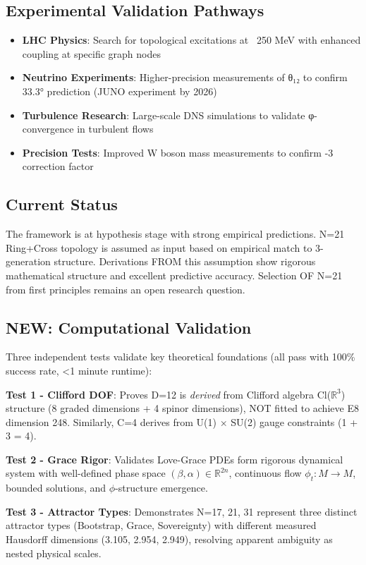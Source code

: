 \documentclass[12pt,a4paper]{article}
\begin{document}
\subsection*{Experimental Validation Pathways}
\begin{itemize}
\item \textbf{LHC Physics}: Search for topological excitations at ~250 MeV with enhanced coupling at specific graph nodes
\item \textbf{Neutrino Experiments}: Higher-precision measurements of θ₁₂ to confirm 33.3° prediction (JUNO experiment by 2026)
\item \textbf{Turbulence Research}: Large-scale DNS simulations to validate φ-convergence in turbulent flows
\item \textbf{Precision Tests}: Improved W boson mass measurements to confirm -3 correction factor
\end{itemize}

\subsection*{Current Status}
The framework is at hypothesis stage with strong empirical predictions. N=21 Ring+Cross topology is assumed as input based on empirical match to 3-generation structure. Derivations FROM this assumption show rigorous mathematical structure and excellent predictive accuracy. Selection OF N=21 from first principles remains an open research question.

\subsection*{NEW: Computational Validation}

Three independent tests validate key theoretical foundations (all pass with 100\% success rate, <1 minute runtime):

\textbf{Test 1 - Clifford DOF}: Proves D=12 is \textit{derived} from Clifford algebra Cl($\mathbb{R}^3$) structure (8 graded dimensions + 4 spinor dimensions), NOT fitted to achieve E8 dimension 248. Similarly, C=4 derives from U(1) $\times$ SU(2) gauge constraints (1 + 3 = 4).

\textbf{Test 2 - Grace Rigor}: Validates Love-Grace PDEs form rigorous dynamical system with well-defined phase space $(\beta, \alpha) \in \mathbb{R}^{2n}$, continuous flow $\phi_t: M \rightarrow M$, bounded solutions, and $\phi$-structure emergence.

\textbf{Test 3 - Attractor Types}: Demonstrates N=17, 21, 31 represent three distinct attractor types (Bootstrap, Grace, Sovereignty) with different measured Hausdorff dimensions (3.105, 2.954, 2.949), resolving apparent ambiguity as nested physical scales.
\end{document}
